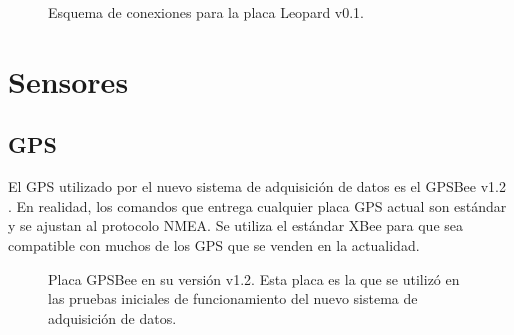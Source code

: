 \documentclass[a4paper,11pt]{article}
\begin{document}
\begin{figure}[!h]
  \centering
  \caption{Esquema de conexiones para la placa Leopard v0.1.}
  \label{fig:leopard_sch}
\end{figure}

\section{Sensores}
\subsection{GPS}
El GPS utilizado por el nuevo sistema de adquisición de datos es el GPSBee v1.2
\cite{bibGPSBee}.
En realidad, los comandos que entrega cualquier placa GPS actual son estándar y
se ajustan al protocolo NMEA. 
Se utiliza el estándar XBee para que sea compatible con muchos de los GPS que se
venden en la actualidad.

\begin{figure}[!h]
  \centering
  \caption{Placa GPSBee en su versión v1.2. Esta placa es la que se utilizó en
las pruebas iniciales de funcionamiento del nuevo sistema de adquisición de
datos.}
  \label{fig:gpsbee}
\end{figure}
\end{document}
